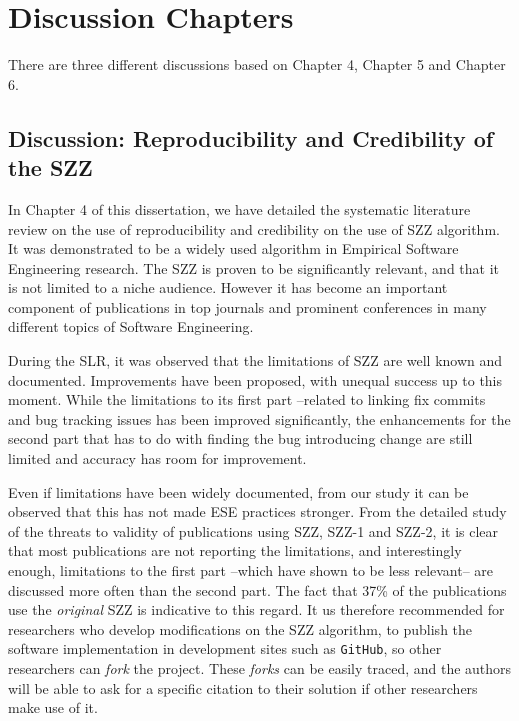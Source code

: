 \documentclass[a4paper, 12pt]{book}
\begin{document}
\section{Discussion Chapters}

There are three different discussions based on Chapter 4, Chapter 5 and Chapter 6.

\subsection{Discussion: Reproducibility and Credibility of the SZZ }
\label{subsec:implicationsSZZ}

In Chapter 4 of this dissertation, we have detailed the systematic literature review on the use of reproducibility and credibility on the use of SZZ algorithm. It was demonstrated to be a widely used algorithm in Empirical Software Engineering research. The SZZ is proven to be significantly relevant, and that it is not limited to a niche audience. However it has become an important component of publications in top journals and prominent conferences in many different topics of Software Engineering. 

During the SLR, it was observed that the limitations of SZZ are well known and documented. Improvements have been proposed, with unequal success up to this moment. While the limitations to its first part --related to linking fix commits and bug tracking issues has been improved significantly, the enhancements for the second part that has to do with finding the bug introducing change are still limited and accuracy has room for improvement.

Even if limitations have been widely documented, from our study it can be observed that this has not made ESE practices stronger. From the detailed study of the threats to validity of publications using SZZ, SZZ-1 and SZZ-2, it is clear that most publications are not reporting the limitations, and interestingly enough, limitations to the first part --which have shown to be less relevant-- are discussed more often than the second part. The fact that 37\% of the publications use the \emph{original} SZZ is indicative to this regard. It us therefore recommended for researchers who develop modifications on the SZZ algorithm, to publish the software implementation in development sites such as \texttt{GitHub}, so other researchers can \emph{fork} the project. These \emph{forks} can be easily traced, and the authors will be able to ask for a specific citation to their solution if other researchers make use of it.
\end{document}
